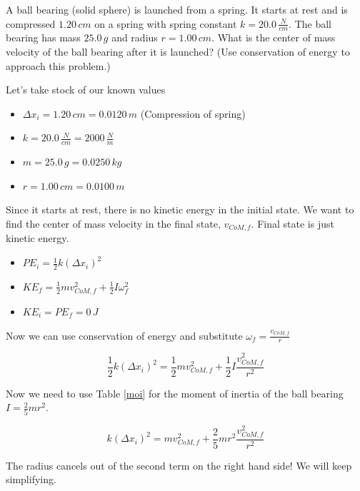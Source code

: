 \documentclass[12pt]{book}
\begin{document}
\begin{exampleblock}

A ball bearing (solid sphere) is launched from a spring. It starts at rest and is compressed $1.20 \, cm$ on a spring with spring constant $k = 20.0 \, \frac{N}{cm}$. The ball bearing has mass $25.0 \, g$ and radius $r = 1.00 \, cm$. What is the center of mass velocity of the ball bearing after it is launched? (Use conservation of energy to approach this problem.)

\hspace{10pt}

Let's take stock of our known values

\begin{itemize}
\item $\Delta x_i = 1.20 \, cm = 0.0120 \, m$ (Compression of spring)
\item $k = 20.0 \, \frac{N}{cm} = 2000 \, \frac{N}{m}$
\item $m = 25.0 \, g = 0.0250 \, kg$
\item $r = 1.00 \, cm = 0.0100 \, m$
\end{itemize}

Since it starts at rest, there is no kinetic energy in the initial state. We want to find the center of mass velocity in the final state, $v_{CoM,f}$. Final state is just kinetic energy. 

\begin{itemize}
\item $PE_i = \frac{1}{2} k (\Delta x_i)^2$
\item $KE_f = \frac{1}{2} m v_{CoM,f}^2 + \frac{1}{2} I \omega_f^2$
\item $KE_i = PE_f = 0 \, J$
\end{itemize}

Now we can use conservation of energy and substitute $\omega_f = \frac{v_{CoM,f}}{r}$

\begin{equation}
\frac{1}{2} k (\Delta x_i)^2 = \frac{1}{2} m v_{CoM,f}^2 + \frac{1}{2} I \frac{v_{CoM,f}^2}{r^2}
\end{equation}

Now we need to use Table \ref{moi} for the moment of inertia of the ball bearing $I = \frac{2}{5} m r^2$.

\begin{equation}
k (\Delta x_i)^2 = m v_{CoM,f}^2 + \frac{2}{5} m r^2 \frac{v_{CoM,f}^2}{r^2}
\end{equation}

The radius cancels out of the second term on the right hand side! We will keep simplifying.


\end{exampleblock}
\end{document}
